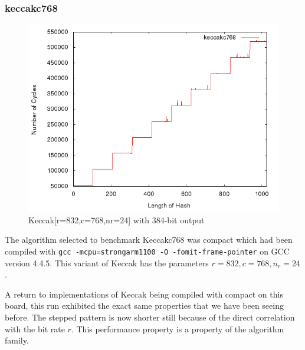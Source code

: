 \subsubsection{keccakc768}
\begin{figure}[H]
    \begin{center}
        \includegraphics[scale=0.5]{images/keccakc768.png} 
        \caption{Keccak[r=832,c=768,nr=24] with 384-bit output}
    \end{center}
\end{figure}

The algorithm selected to benchmark Keccakc768 was compact which had been
compiled with \texttt{gcc -mcpu=strongarm1100 -O -fomit-frame-pointer} on GCC
version 4.4.5. This variant of Keccak has the parameters $r=832,c=768,n_r=24$.

A return to implementations of Keccak being compiled with compact on this board,
this run exhibited the exact same properties that we have been seeing before.
The stepped pattern is now shorter still because of the direct correlation with
the bit rate $r$. This performance property is a property of the algorithm
family.


